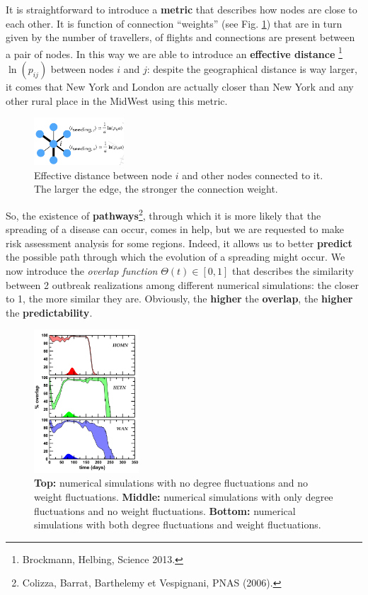\documentclass[../main/main.tex]{subfiles}
\begin{document}
It is straightforward to introduce a \textbf{metric} that describes how nodes are close to each other. It is function of connection “weights” (see Fig. \ref{fig:14_03}) that are in turn given by the number of travellers, of flights and connections are present between a pair of nodes. In this way we are able to introduce an \textbf{effective distance} \footnote{Brockmann, Helbing, Science 2013.} $\ln(p_{ij})$ between nodes $i$ and $j$: despite the geographical distance is way larger, it comes that New York and London are actually closer than New York and any other rural place in the MidWest using this metric.

\begin{figure}[h!]
\centering
\includegraphics[width=0.3\textwidth]{../lessons/image/15/image03.png}
\caption{\label{fig:14_03} Effective distance between node $i$ and other nodes connected to it. The larger the edge, the stronger the connection weight.}
\end{figure}

So, the existence of \textbf{pathways}\footnote{Colizza, Barrat, Barthelemy et Vespignani, PNAS (2006).}, through which it is more likely that the spreading of a disease can occur, comes in help, but we are requested to make risk assessment analysis for some regions.
Indeed, it allows us to better \textbf{predict} the possible path through which the evolution of a spreading might occur. We now introduce the \textit{overlap function} $\Theta(t) \in [0,1]$ that describes the similarity between 2 outbreak realizations among different numerical simulations: the closer to 1, the more similar they are. Obviously, the \textbf{higher} the \textbf{overlap}, the \textbf{higher} the \textbf{predictability}.

\begin{figure}[h!]
\centering
\includegraphics[width=0.35\textwidth]{../lessons/image/15/image04.png}
\caption{\label{fig:14_04} \textbf{Top:} numerical simulations with no degree fluctuations and no weight fluctuations. \textbf{Middle:} numerical simulations with only degree fluctuations and no weight fluctuations. \textbf{Bottom:} numerical simulations with both degree fluctuations and weight fluctuations.}
\end{figure}
\end{document}

